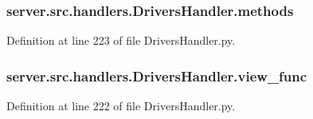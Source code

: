 \subsubsection[{\texorpdfstring{methods}{methods}}]{\setlength{\rightskip}{0pt plus 5cm}server.\+src.\+handlers.\+Drivers\+Handler.\+methods}\hypertarget{namespaceserver_1_1src_1_1handlers_1_1_drivers_handler_a3634d5c3f882ab668da5e543eaec9be9}{}\label{namespaceserver_1_1src_1_1handlers_1_1_drivers_handler_a3634d5c3f882ab668da5e543eaec9be9}


Definition at line 223 of file Drivers\+Handler.\+py.

\subsubsection[{\texorpdfstring{view\+\_\+func}{view_func}}]{\setlength{\rightskip}{0pt plus 5cm}server.\+src.\+handlers.\+Drivers\+Handler.\+view\+\_\+func}\hypertarget{namespaceserver_1_1src_1_1handlers_1_1_drivers_handler_af37c168b94ff719ffb324453c5c1cd06}{}\label{namespaceserver_1_1src_1_1handlers_1_1_drivers_handler_af37c168b94ff719ffb324453c5c1cd06}


Definition at line 222 of file Drivers\+Handler.\+py.

